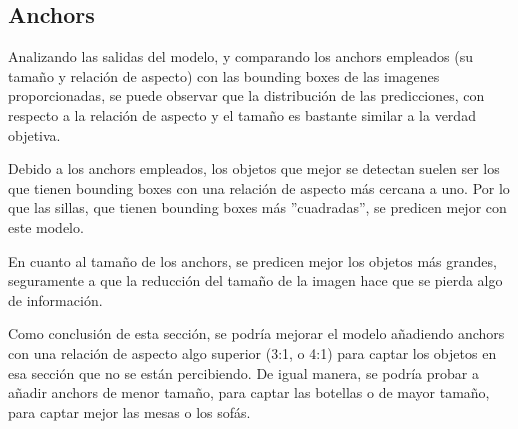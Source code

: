 \subsection{Anchors}

    Analizando las salidas del modelo, y comparando los anchors empleados 
    (su tamaño y relación de aspecto) con las bounding boxes de las imagenes proporcionadas, 
    se puede observar que la distribución de las predicciones, con respecto a la relación de aspecto 
    y el tamaño es bastante similar a la verdad objetiva.

    Debido a los anchors empleados, los objetos que mejor se detectan suelen ser 
    los que tienen bounding boxes con una relación de aspecto más cercana a uno. 
    Por lo que las sillas, que tienen bounding boxes más ''cuadradas'', se predicen mejor con este modelo.

    En cuanto al tamaño de los anchors, se predicen mejor los objetos más grandes, 
    seguramente a que la reducción del tamaño de la imagen hace que se pierda algo de información.

    Como conclusión de esta sección, se podría mejorar el modelo añadiendo 
    anchors con una relación de aspecto algo superior (3:1, o 4:1) para captar 
    los objetos en esa sección que no se están percibiendo. De igual manera, 
    se podría probar a añadir anchors de menor tamaño, para captar las botellas o de 
    mayor tamaño, para captar mejor las mesas o los sofás.

